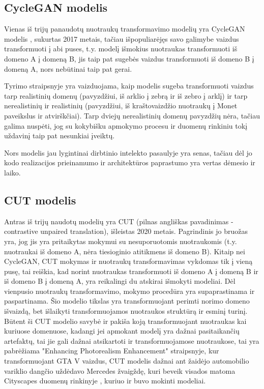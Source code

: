 \documentclass{VUMIFPSkursinis}
\begin{document}
    \subsection{CycleGAN modelis}
        Vienas iš trijų panaudotų nuotraukų transformavimo modelių yra CycleGAN modelis \cite{CycleGAN2017}, sukurtas 2017 metais, tačiau išpopuliarėjęs savo galimybe vaizdus transformuoti į abi puses, t.y. modelį išmokius nuotraukas transformuoti iš domeno A į domeną B, jis taip pat sugebės vaizdus transformuoti iš domeno B į domeną A, nors nebūtinai taip pat gerai.

        Tyrimo straipsnyje yra vaizduojama, kaip modelis sugeba transformuoti vaizdus tarp realistinių domenų (pavyzdžiui, iš arklio į zebrą ir iš zebro į arklį) ir tarp nerealistinių ir realistinių (pavyzdžiui, iš kraštovaizdžio nuotraukų į Monet paveikslus ir atvirškčiai). Tarp dviejų nerealistinių domenų pavyzdžių nėra, tačiau galima nuspėti, jog su kokybišku apmokymo procesu ir duomenų rinkiniu tokį uždavinį taip pat nesunkiai įveiktų.

        Nors modelis jau lygintinai dirbtinio intelekto pasaulyje yra senas, tačiau dėl jo kodo realizacijos prieinamumo ir architektūros paprastumo yra vertas dėmesio ir laiko.
        
    \subsection{CUT modelis}
        Antras iš trijų naudotų modelių yra CUT (pilnas angliškas pavadinimas - contrastive unpaired translation), išleistas 2020 metais. Pagrindinis jo bruožas yra, jog jis yra pritaikytas mokymui su nesuporuotomis nuotraukomis (t.y. nuotraukai iš domeno A, nėra tiesioginio atitikmens iš domeno B). Kitaip nei CycleGAN, CUT mokymas ir nuotraukų transformavimas vykdomas tik į vieną pusę, tai reiškia, kad norint nuotraukas transformuoti iš domeno A į domeną B ir iš domeno B į domeną A, yra reikalingi du atskirai išmokyti modeliai. Dėl vienpusio nuotraukų transformavimo, mokymo procedūra yra supaprastinama ir paspartinama. Šio modelio tikslas yra transformuojant perimti norimo domeno išvaizdą, bet išlaikyti transformuojamos nuotraukos struktūrą ir esminį turinį. Būtent ši CUT modelio savybė ir pakiša koją transformuojant nuotraukas kai kuriuose domenuose, kadangi jei apmokant modelį yra dažnai pasitaikančių artefaktų, tai jie gali dažnai atsikartoti ir transformuojamose nuotraukose, tai yra pabrėžiama "Enhancing Photorealism Enhancement" \cite{EnPhEn} straipsnyje, kur transformuojant GTA V vaizdus, CUT modelis dažnai ant žaidėjo automobilio variklio dangčio uždėdavo Mercedes žvaigždę, kuri beveik visados matoma Cityscapes duomenų rinkinyje \cite{DaimCityDaSe}, kuriuo ir buvo mokinti modeliai.
\end{document}
